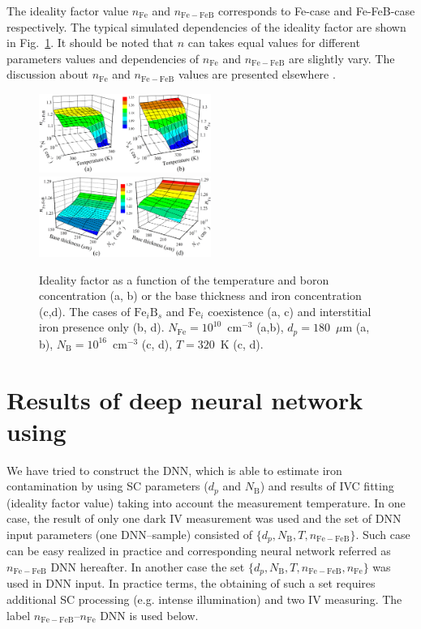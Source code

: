 \documentclass[journal]{IEEEtran}
\begin{document}
The ideality factor value $n_\mathrm{Fe}$ and $n_\mathrm{Fe-FeB}$ corresponds to Fe-case and Fe-FeB-case respectively.
The typical simulated dependencies of  the ideality factor are shown in Fig.~\ref{fig_nValues}.
It should be noted that $n$ can takes equal values for different parameters values
and dependencies of $n_\mathrm{Fe}$ and $n_\mathrm{Fe-FeB}$ are slightly vary.
The discussion about $n_\mathrm{Fe}$ and $n_\mathrm{Fe-FeB}$  values are presented elsewhere \cite{OlikhJPS}.


\begin{figure}[bt]
\centering
\includegraphics[width=0.5\textwidth]{Fig1a}
\includegraphics[width=0.5\textwidth]{Fig1b}
\caption{Ideality factor as a function of the temperature and boron concentration (a, b)
or the base thickness and iron concentration (c,d).
The cases of $\mathrm{Fe}_i\mathrm{B}_s$ and $\mathrm{Fe}_i$ coexistence (a, c)
and interstitial iron presence only (b, d).
$N_\mathrm{Fe}=10^{10}$~cm$^{-3}$ (a,b),
$d_p=180$~$\mu$m (a, b),
$N_\mathrm{B}=10^{16}$~cm$^{-3}$ (c, d),
$T=320$~K (c, d).
}
\label{fig_nValues}
\end{figure}


\section{Results of deep neural network using}

We have tried to construct the DNN, which is able to estimate iron contamination by using
SC parameters ($d_p$ and $N_\mathrm{B}$) and results of IVC fitting (ideality factor value)
taking into account the measurement temperature.
In one case, the result of only one dark IV measurement was used and the
set of DNN input parameters (one DNN--sample) consisted of $\{d_p,N_\mathrm{B},T,n_\mathrm{Fe-FeB}\}$.
Such case can be easy realized in practice
and corresponding neural network referred as $n_\mathrm{Fe-FeB}$ DNN hereafter.
In another case the set $\{d_p,N_\mathrm{B},T,n_\mathrm{Fe-FeB},n_\mathrm{Fe}\}$ was used in DNN input.
In practice terms, the obtaining of such a set requires additional SC processing (e.g. intense illumination) and two IV measuring.
The label $n_\mathrm{Fe-FeB}$--$n_\mathrm{Fe}$ DNN is used below.
\end{document}
